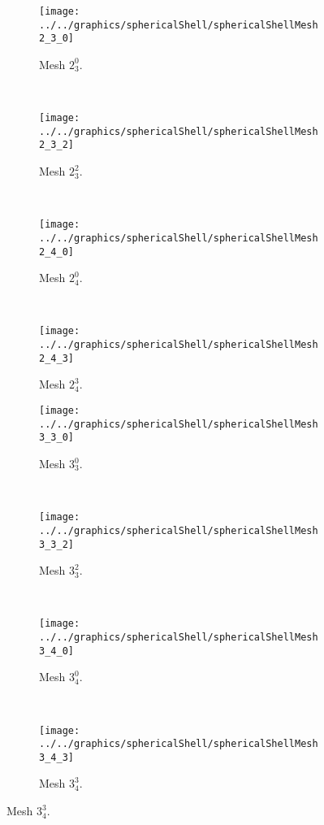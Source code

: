 \begin{figure}
	\centering        
	\begin{subfigure}{0.23\textwidth}
		\centering
		\texttt{[image: ../../graphics/sphericalShell/sphericalShellMesh2\_3\_0]}
		\caption{Mesh $2_3^0$.}
		\label{Fig2:SphericalShellMesh2_3_0}
	\end{subfigure}
	~
	\begin{subfigure}{0.23\textwidth}
		\centering
		\texttt{[image: ../../graphics/sphericalShell/sphericalShellMesh2\_3\_2]}
		\caption{Mesh $2_3^2$.}
		\label{Fig2:SphericalShellMesh2_3_2}
	\end{subfigure}
	~
	\begin{subfigure}{0.23\textwidth}
		\centering
		\texttt{[image: ../../graphics/sphericalShell/sphericalShellMesh2\_4\_0]}
		\caption{Mesh $2_4^0$.}
		\label{Fig2:SphericalShellMesh2_4_0}
	\end{subfigure}
	~
	\begin{subfigure}{0.23\textwidth}
		\centering
		\texttt{[image: ../../graphics/sphericalShell/sphericalShellMesh2\_4\_3]}
		\caption{Mesh $2_4^3$.}
		\label{Fig2:SphericalShellMesh2_4_3}
	\end{subfigure}
	\par\bigskip  
	\begin{subfigure}{0.23\textwidth}
		\centering
		\texttt{[image: ../../graphics/sphericalShell/sphericalShellMesh3\_3\_0]}
		\caption{Mesh $3_3^0$.}
		\label{Fig2:SphericalShellMesh3_3_0}
	\end{subfigure}
	~
	\begin{subfigure}{0.23\textwidth}
		\centering
		\texttt{[image: ../../graphics/sphericalShell/sphericalShellMesh3\_3\_2]}
		\caption{Mesh $3_3^2$.}
		\label{Fig2:SphericalShellMesh3_3_2}
	\end{subfigure}
	~
	\begin{subfigure}{0.23\textwidth}
		\centering
		\texttt{[image: ../../graphics/sphericalShell/sphericalShellMesh3\_4\_0]}
		\caption{Mesh $3_4^0$.}
		\label{Fig2:SphericalShellMesh3_4_0}
	\end{subfigure}
	~
	\begin{subfigure}{0.23\textwidth}
		\centering
		\texttt{[image: ../../graphics/sphericalShell/sphericalShellMesh3\_4\_3]}
		\caption{Mesh $3_4^3$.}
		\label{Fig2:SphericalShellMesh3_4_3}
	\end{subfigure}

\end{figure}

